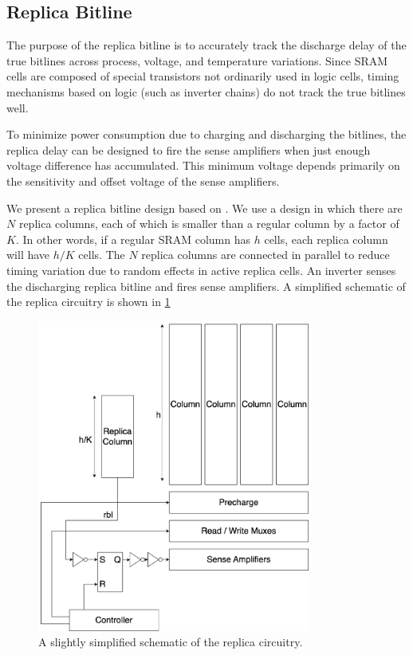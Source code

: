 \subsection{Replica Bitline} \label{sec:replica-bitline}

The purpose of the replica bitline is to accurately track the discharge delay of the true bitlines across
process, voltage, and temperature variations. Since SRAM cells are composed of special transistors
not ordinarily used in logic cells, timing mechanisms based on logic (such as inverter chains) do not
track the true bitlines well.

To minimize power consumption due to charging and discharging the bitlines,
the replica delay can be designed to fire the sense amplifiers when just enough voltage difference
has accumulated. This minimum voltage depends primarily on the sensitivity and offset voltage of the
sense amplifiers.

We present a replica bitline design based on \cite{replicabl}.
We use a design in which there are $N$ replica columns, each of which is smaller than a regular column by a factor of $K$. In other words, if a regular SRAM column has $h$ cells, each replica column will have $h/K$ cells.
The $N$ replica columns are connected in parallel to reduce timing variation due to random effects in active replica cells.
An inverter senses the discharging replica bitline and fires sense amplifiers.
A simplified schematic of the replica circuitry is shown in \ref{fig:replica-schematic}

\begin{figure}[H] \centering
\includegraphics[width=0.8\textwidth]{figures/replica_schematic.png}
\caption{A slightly simplified schematic of the replica circuitry. \label{fig:replica-schematic}}
\end{figure}

